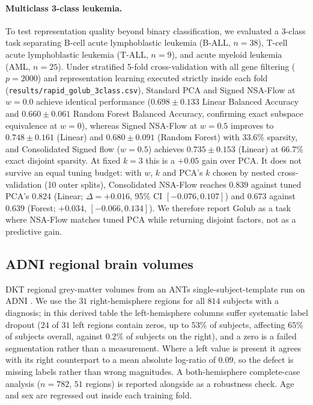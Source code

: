 \documentclass[11pt]{article}
\theoremstyle{definition}
\begin{document}
\paragraph{Multiclass 3-class leukemia.} To test representation quality beyond
binary classification, we evaluated a 3-class task separating B-cell acute
lymphoblastic leukemia (B-ALL, $n=38$), T-cell acute lymphoblastic leukemia
(T-ALL, $n=9$), and acute myeloid leukemia (AML, $n=25$). Under stratified
5-fold cross-validation with all gene filtering ($p=2000$) and representation
learning executed strictly inside each fold (\texttt{results/rapid\_golub\_3class.csv}),
Standard PCA and Signed NSA-Flow at $w=0.0$ achieve identical performance
($0.698 \pm 0.133$ Linear Balanced Accuracy and $0.660 \pm 0.061$ Random Forest
Balanced Accuracy, confirming exact subspace equivalence at $w=0$), whereas
Signed NSA-Flow at $w=0.5$ improves to $0.748 \pm 0.161$ (Linear) and
$0.680 \pm 0.091$ (Random Forest) with $33.6\%$ sparsity, and Consolidated
Signed flow ($w=0.5$) achieves $0.735 \pm 0.153$ (Linear) at $66.7\%$ exact
disjoint sparsity. At fixed $k=3$ this is a $+0.05$ gain over PCA. It does not survive an equal
tuning budget: with $w$, $k$ and PCA's $k$ chosen by nested cross-validation
(10 outer splits), Consolidated NSA-Flow reaches $0.839$ against tuned PCA's
$0.824$ (Linear; $\Delta=+0.016$, 95\% CI $[-0.076, 0.107]$) and $0.673$ against
$0.639$ (Forest; $+0.034$, $[-0.066, 0.134]$). We therefore report Golub as a
task where NSA-Flow matches tuned PCA while returning disjoint factors, not as
a predictive gain.



\subsection{ADNI regional brain volumes}

DKT \citep{klein2012} regional grey-matter volumes from an ANTs
single-subject-template run \citep{avants2011,tustison2014} on ADNI
\citep{petersen2010}. We use the $31$ right-hemisphere regions for all $814$
subjects with a diagnosis; in this derived table the left-hemisphere columns
suffer systematic label dropout ($24$ of $31$ left regions contain zeros, up to
$53\%$ of subjects, affecting $65\%$ of subjects overall, against $0.2\%$ of
subjects on the right), and a zero is a failed segmentation rather than a
measurement. Where a left value is present it agrees with its right counterpart
to a mean absolute log-ratio of $0.09$, so the defect is missing labels rather
than wrong magnitudes. A both-hemisphere complete-case analysis ($n=782$, $51$
regions) is reported alongside as a robustness check. Age and sex are regressed
out inside each training fold.
\end{document}
